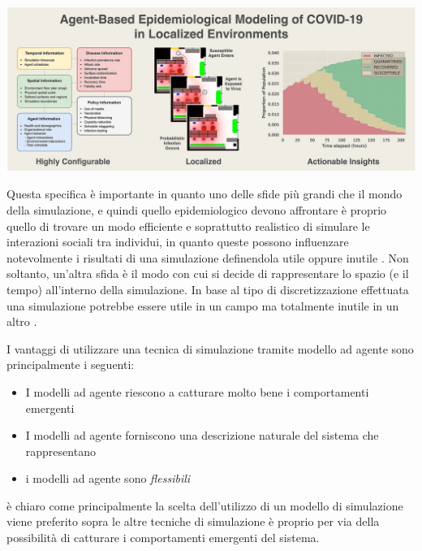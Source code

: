 \begin{minipage}{\linewidth}
    \centering
    \includegraphics{img/1-s2.0-S0010482522001883-ga1.jpg}
    \label{fig:abm_covid}
\end{minipage}

Questa specifica è importante in quanto uno delle sfide più grandi che 
il mondo della simulazione, e quindi quello epidemiologico devono affrontare
è proprio quello di trovare un modo efficiente e soprattutto realistico 
di simulare le interazioni sociali tra individui, in quanto queste possono
influenzare notevolmente i risultati di una simulazione definendola utile
oppure inutile \cite{Silverman2021}. Non soltanto, un'altra sfida è il modo 
con cui si decide di rappresentare lo spazio (e il tempo) all'interno della
simulazione. In base al tipo di discretizzazione effettuata una simulazione
potrebbe essere utile in un campo ma totalmente inutile in un altro 
\cite{KONSTANTINOUDIS2020100319}.

I vantaggi di utilizzare una tecnica di simulazione tramite modello ad agente
sono principalmente i seguenti:
\begin{itemize}
    \item I modelli ad agente riescono a catturare molto bene i comportamenti emergenti
    \item I modelli ad agente forniscono una descrizione naturale del sistema che rappresentano 
    \item i modelli ad agente sono \emph{flessibili}
\end{itemize}
è chiaro come principalmente la scelta dell'utilizzo di un modello di simulazione viene preferito 
sopra le altre tecniche di simulazione è proprio per via della possibilità di catturare i 
comportamenti emergenti del sistema.

